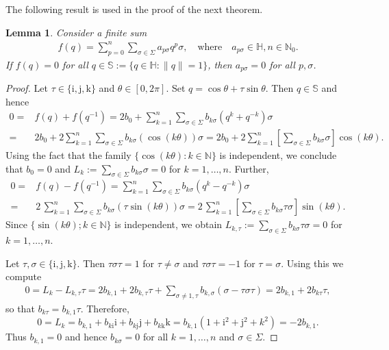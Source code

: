 \documentclass[11pt,a4paper]{amsart}
\newtheorem{lemma}[theorem]{Lemma}
\theoremstyle{definition}
\begin{document}
The following result is used in the proof of the next theorem.
%
\begin{lemma}%
\label{fqzerolemma}
Consider a finite sum
%
\begin{align*}
f(q)=\sum _{p=0}^{n}\sum _{\sigma \in \Sigma} a_{p\sigma} q^{p}
\sigma ,\quad \textrm{where} \quad a_{p\sigma}\in \mathbb{H}, n\in
\mathbb{N}_{0}.
\end{align*}
%
If $f(q)=0$ for all $q\in \mathbb{S}:=\{ q\in \mathbb{H}: \|q\|=1\}$, then
$a_{p\sigma}=0$ for all $p,\sigma $.
\end{lemma}
%
\begin{proof}
Let $\tau \in \{\mathrm{i}, \mathrm{j}, \mathrm{k}\}$ and
$\theta \in [0,2\pi ]$. Set $q=\cos \theta +\tau \sin \theta $. Then
$q\in \mathbb{S}$ and hence
%
\begin{align*}
0 =&f(q)+f(q^{-1})= 2b_{0}+\sum _{k=1}^{n}\sum _{\sigma \in \Sigma } b_{k
\sigma} (q^{k}+q^{-k})\sigma
\\
=&2b_{0}+ 2 \sum _{k=1}^{n}\sum _{\sigma \in \Sigma } b_{k\sigma}(
\cos (k \theta ))\sigma =2b_{0}+ 2\sum _{k=1}^{n}\left [\sum _{
\sigma \in \Sigma } b_{k\sigma}\sigma \right ] \cos (k\theta ).
\end{align*}
%
Using the fact that the family
$\{\cos (k\theta ): k\in {\mathbb N}\}$ is independent, we conclude that
$b_{0}=0$ and
$L_{k}:=\sum \nolimits _{\sigma \in \Sigma } b_{k\sigma}\sigma =0$ for
$k=1,\dots ,n$. Further,
%
\begin{align*}
0 =&f(q)-f(q^{-1})= \sum _{k=1}^{n}\sum _{\sigma \in \Sigma } b_{k
\sigma} (q^{k}-q^{-k})\sigma
\\
=&2 \, \sum _{k=1}^{n}\sum _{\sigma \in \Sigma } b_{k\sigma} (\tau
\sin (k\theta ))\sigma = 2\, \sum _{k=1}^{n}\left [\sum _{\sigma \in
\Sigma } b_{k\sigma}\tau \sigma \right ]\sin (k\theta ).
\end{align*}
%
Since $\{\sin (k\theta ); k\in {\mathbb N}\}$ is independent, we obtain
$L_{k,\tau}:=\sum \nolimits _{\sigma \in \Sigma } b_{k\sigma}\tau
\sigma =0$ for $k=1,\dots ,n$.

Let $\tau ,\sigma \in \{\mathrm{i}, \mathrm{j}, \mathrm{k}\}$. Then
$\tau \sigma \tau =1$ for $\tau \ne \sigma $ and
$\tau \sigma \tau =-1$ for $\tau =\sigma $. Using this we compute
%
\begin{align*}
0= L_{k} -L_{k,\tau}\tau = 2b_{k,1} +2 b_{k,\tau} \tau +\sum _{
\sigma \neq 1, \tau} b_{k,\sigma} (\sigma -\tau \sigma \tau ) =2 b_{k,1}+
2b_{k\tau}\tau ,
\end{align*}
%
so that $b_{k\tau}=b_{k,1}\tau $. Therefore,
%
\begin{equation*}
0=L_{k}=b_{k,1}+b_{k \mathrm{i}}\mathrm{i}+b_{k \mathrm{j}}\mathrm{j}+b_{k
\mathrm{k}}\mathrm{k}=b_{k,1}(1+\mathrm{i}^{2}+\mathrm{j}^{2}+k^{2})=-2b_{k,1}.
\end{equation*}
%
Thus $b_{k,1}=0$ and hence $b_{k \sigma}=0$ for all $k=1,\dots ,n$ and
$\sigma \in \Sigma $.
\end{proof}
\end{document}

